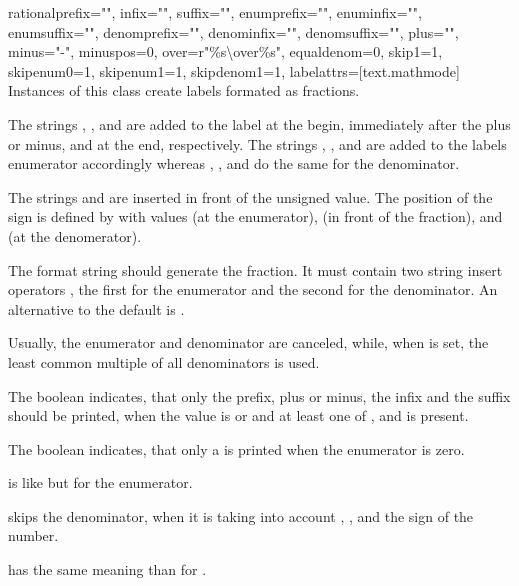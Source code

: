\begin{classdesc}{rational}{prefix="", infix="", suffix="",
                            enumprefix="", enuminfix="", enumsuffix="",
                            denomprefix="", denominfix="", denomsuffix="",
                            plus="", minus="-", minuspos=0, over=r"{{\%s}\textbackslash over{\%s}}",
                            equaldenom=0, skip1=1, skipenum0=1, skipenum1=1, skipdenom1=1,
                            labelattrs=[text.mathmode]}
  Instances of this class create labels formated as fractions.

  The strings , , and  are added to
  the label at the begin, immediately after the plus or minus, and at
  the end, respectively. The strings ,
  , and  are added to the labels
  enumerator accordingly whereas , ,
  and  do the same for the denominator.

  The strings  and  are inserted in front of the
  unsigned value. The position of the sign is defined by
   with values  (at the enumerator), 
  (in front of the fraction), and  (at the denomerator).

  The format string  should generate the fraction. It
  must contain two string insert operators , the first for
  the enumerator and the second for the denominator. An alternative to
  the default is .

  Usually, the enumerator and denominator are canceled, while, when
   is set, the least common multiple of all
  denominators is used.

  The boolean  indicates, that only the prefix, plus or minus,
  the infix and the suffix should be printed, when the value is
   or  and at least one of , 
  and  is present.

  The boolean  indicates, that only a  is
  printed when the enumerator is zero.

   is like  but for the enumerator.

   skips the denominator, when it is  taking
  into account , , 
   and the sign of the number.

   has the same meaning than for .
\end{classdesc}

